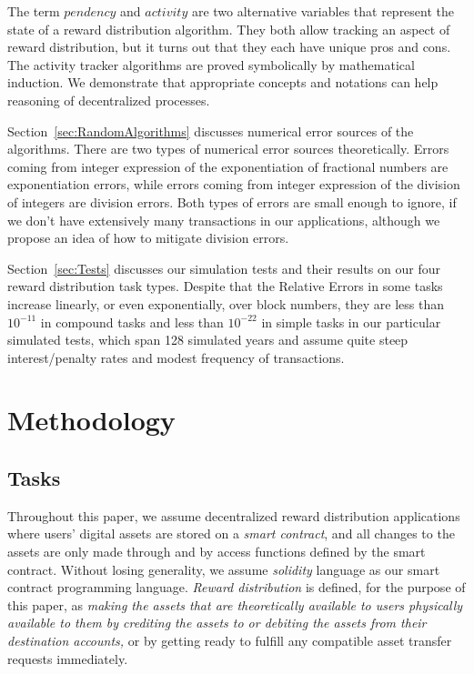 \documentclass{article}
\begin{document}
The term $pendency$ and $activity$ are two alternative variables that 
represent the state of a reward distribution algorithm. 
They both allow tracking an aspect of reward distribution, but it turns 
out that they each have unique pros and cons.
The activity tracker algorithms are proved symbolically by mathematical 
induction. We demonstrate that appropriate concepts and notations 
can help reasoning of decentralized processes.

Section~\ref{sec:RandomAlgorithms} discusses numerical error 
sources of the algorithms. There are two types of numerical error sources 
theoretically. Errors coming from integer expression of the exponentiation 
of fractional numbers are exponentiation errors, 
while errors coming from integer expression of the division of integers 
are division errors. Both types of errors are small enough to ignore, if 
we don't have extensively many transactions in our applications, 
although we propose an idea of how to mitigate division errors.

Section~\ref{sec:Tests} discusses our simulation tests and their results on our 
four reward distribution task types.
Despite that the Relative Errors in some tasks increase linearly, or 
even exponentially, over block numbers, 
they are less than $10^{-11}$ in compound tasks and less than $10^{-22}$ 
in simple tasks in our particular simulated tests, which span 128 simulated 
years and assume quite steep interest/penalty rates and modest frequency 
of transactions.

\section{Methodology}
\label{sec:Methodology}

\subsection{Tasks}
\label{sec:Tasks}
Throughout this paper, we assume decentralized reward distribution applications  
where users' digital assets are stored on a \textit{smart contract}, 
and all changes to the assets are only made through and by access functions 
defined by the smart contract. Without losing generality, we assume 
\textit{solidity} language as our smart contract programming language.
\textit{Reward distribution} is defined, for the purpose of this paper, 
as \textit{making the assets that are theoretically available to users physically 
available to them by crediting the assets to or debiting the assets from their 
destination accounts,} 
or by getting ready to fulfill any compatible asset transfer requests immediately.
\end{document}
